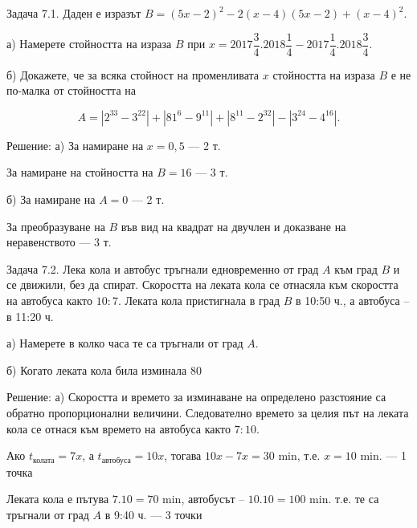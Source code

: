 
Задача 7.1. Даден е изразът $B=(5x-2)^2-2(x-4)(5x-2)+(x-4)^2$.

а) Намерете стойността на израза $B$ при $x=2017\dfrac{3}{4}.2018\dfrac{1}{4}-2017\dfrac{1}{4}.2018\dfrac{3}{4}$.

б) Докажете, че за всяка стойност на променливата $x$ стойността на израза $B$ е не по-малка от стойността на

$$A=\left|2^{33}-3^{22}\right|+\left|81^6-9^{11}\right|+\left|8^{11}-2^{32}\right|-\left|3^{24}-4^{16}\right|.$$

Решение: а) За намиране на $x=0,5$ — 2 т.

За намиране на стойността на $B=16$ — 3 т.

б) За намиране на $A=0$ — 2 т.

За преобразуване на $B$ във вид на квадрат на двучлен и доказване на неравенството — 3 т.

Задача 7.2. Лека кола и автобус тръгнали едновременно от град $A$ към град $B$ и се движили, без да спират. Скоростта на леката кола се отнасяла към скоростта на автобуса както $10:7$. Леката кола пристигнала в град $B$ в 10:50 ч., а автобуса – в 11:20 ч.

а) Намерете в колко часа те са тръгнали от град $A$.

б) Когато леката кола била изминала 80 %

Решение: а) Скоростта и времето за изминаване на определено разстояние са обратно пропорционални величини. Следователно времето за целия път на леката кола се отнася към времето на автобуса както $7:10$.

Ако $t_{\text{колата}}=7x$, а $t_{\text{автобуса}}=10x$, тогава $10x-7x=30$ min, т.е. $x=10$ min. — 1 точка

Леката кола е пътува $7.10=70$ min, автобусът – $10.10=100$ min. т.е. те са тръгнали от град $A$ в 9:40 ч. — 3 точки

